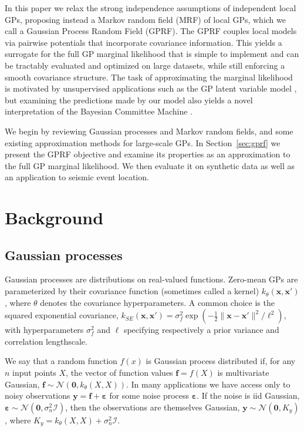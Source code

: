 \documentclass{article}
\newcommand{\N}{\mathcal{N}}
\newcommand{\I}{\mathcal{I}}
\newcommand{\eps}{\varepsilon}
\renewcommand{\v}[1]{\mathbf{#1}}
\begin{document}
In this paper we relax the strong independence assumptions of
independent local GPs, proposing instead a Markov random field (MRF) of
local GPs, which we call a Gaussian Process Random Field (GPRF). The
GPRF couples local models via pairwise potentials that incorporate
covariance information. This yields a surrogate for the full GP
marginal likelihood that is simple to implement and 
can be tractably evaluated and optimized on
large datasets, while still enforcing a smooth covariance
structure. The task of approximating the marginal likelihood is
motivated by unsupervised applications such as the GP latent variable
model \cite{lawrence2004gaussian}, but examining the predictions made by our model also
yields a novel interpretation of the Bayesian Committee Machine \cite{tresp2000bayesian}.

We begin by reviewing Gaussian processes and Markov random fields, and
some existing approximation methods for large-scale GPs. In
Section~\ref{sec:gprf} we present the GPRF objective and examine its
properties as an approximation to the full GP marginal likelihood.  We
then evaluate it on synthetic data as well as an application to seismic event location. 

\section{Background}

\subsection{Gaussian processes}
Gaussian processes \citep{rasmussen2006} are
distributions on real-valued functions. Zero-mean GPs are
parameterized by their covariance function (sometimes called a kernel)
$k_\theta(\v{x}, \v{x}')$,  where $\theta$ denotes the covariance hyperparameters. A common choice is the squared
exponential covariance, $k_{SE}(\v{x}, \v{x}') =
\sigma^2_f\exp\left(-\frac{1}{2}\|\v{x}-\v{x}'\|^2 / \ell^2\right)$, with
hyperparameters $\sigma^2_f$  and $\ell$ specifying respectively a
prior variance and correlation lengthscale. 

We say that a random function $f(x)$ is Gaussian process distributed if, for
any $n$ input points $X$, the vector of function values $\v{f} = f(X)$ is
multivariate Gaussian, $\v{f} \sim \N(\v{0}, k_\theta(X, X)).$ In many applications we
have access only to noisy observations $\v{y} = \v{f} + \v{\eps}$ for some
noise process $\v{\eps}$. If the noise is iid Gaussian, $\v{\eps}\sim
\N(\v{0}, \sigma_n^2 \I)$, then the observations are themselves Gaussian, $\v{y} \sim \N(\v{0}, K_y)$, where $K_y = k_\theta(X, X) + \sigma^2_n\I.$
\end{document}
